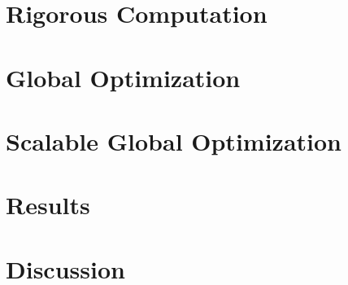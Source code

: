 \documentclass[../main.tex]{subfiles}
\begin{document}
  
  \section{Rigorous Computation}
    

  \section{Global Optimization}
    

  \section{Scalable Global Optimization}
    \label{sec:gopt}
    

  \section{Results}
    

  \section{Discussion}
    
\end{document}
